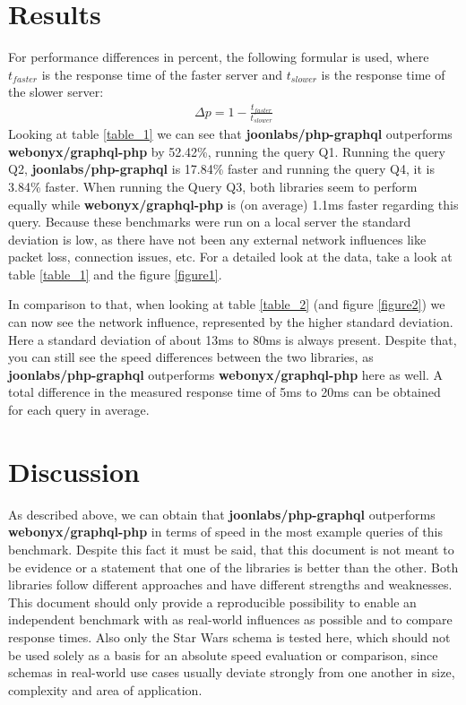 \documentclass[11pt, a4paper]{article}
\begin{document}
\section{Results}
For performance differences in percent, the following formular is used, where $t_{faster}$ is the response time of the faster server and $t_{slower}$ is the response time of the slower server:
\begin{align}
    \Delta p = 1 - \frac{t_{faster}}{t_{slower}}
\end{align}
Looking at table \ref{table_1} we can see that \textbf{joonlabs/php-graphql} outperforms \textbf{webonyx/graphql-php} by 52.42\%, running the query Q1. Running the query Q2,  \textbf{joonlabs/php-graphql} is 17.84\% faster and running the query Q4, it is 3.84\% faster. When running the Query Q3, both libraries seem to perform equally while \textbf{webonyx/graphql-php} is (on average) 1.1ms faster regarding this query. Because these benchmarks were run on a local server the standard deviation is low, as there have not been any external network influences like packet loss, connection issues, etc. For a detailed look at the data, take a look at table \ref{table_1} and the figure \ref{figure1}.

In comparison to that, when looking at table \ref{table_2} (and figure \ref{figure2}) we can now see the network influence, represented by the higher standard deviation. Here a standard deviation of about 13ms to 80ms is always present. Despite that, you can still see the speed differences between the two libraries, as \textbf{joonlabs/php-graphql} outperforms \textbf{webonyx/graphql-php} here as well. A total difference in the measured response time of 5ms to 20ms can be obtained for each query in average.

\section{Discussion}
As described above, we can obtain that \textbf{joonlabs/php-graphql} outperforms \textbf{webonyx/graphql-php} in terms of speed in the most example queries of this benchmark. Despite this fact it must be said, that this document is not meant to be evidence or a statement that one of the libraries is better than the other. Both libraries follow different approaches and have different strengths and weaknesses. This document should only provide a reproducible possibility to enable an independent benchmark with as real-world influences as possible and to compare response times. Also only the Star Wars schema is tested here, which should not be used solely as a basis for an absolute speed evaluation or comparison, since schemas in real-world use cases usually deviate strongly from one another in size, complexity and area of application.
\end{document}
